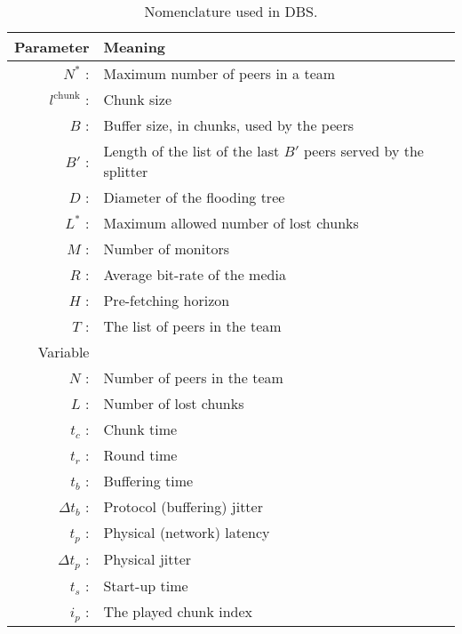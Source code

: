 \begin{table}[t]
  \centering
  \begin{tabular}{rl}
    Parameter & Meaning \\
    \hline
    $N^*$ :  & Maximum number of peers in a team \\
    $l^{\mathrm{chunk}}$ : & Chunk size \\
    $B$ :    & Buffer size, in chunks, used by the peers \\
    $B'$ :   & Length of the list of the last $B'$ peers served by the splitter \\ 
    $D$ :    & Diameter of the flooding tree \\
    $L^*$ :  & Maximum allowed number of lost chunks \\
    $M$ :    & Number of monitors \\
    $R$ :    & Average bit-rate of the media \\
    $H$ :    & Pre-fetching horizon \\
    $T$ :    & The list of peers in the team \\
    Variable & \\
    \hline
    $N$ :    & Number of peers in the team \\
    $L$ :    & Number of lost chunks \\
    $t_c$ :  & Chunk time \\
    $t_r$ :  & Round time \\
    $t_b$ :  & Buffering time \\
    $\Delta t_b$ : & Protocol (buffering) jitter \\ 
    $t_p$ :  & Physical (network) latency \\
    $\Delta t_p$ : & Physical jitter \\
    $t_s$ :  & Start-up time \\
    $i_p$ :  & The played chunk index 
  \end{tabular}
  \caption{Nomenclature used in DBS.} %
  \label{tab:DBS_nomenclature}
\end{table}
